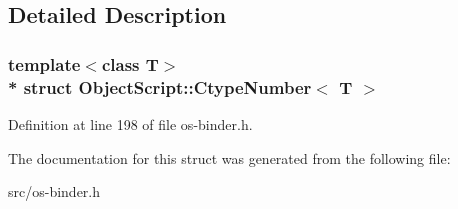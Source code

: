 \subsection{Detailed Description}
\subsubsection*{template$<$class T$>$\\*
struct Object\+Script\+::\+Ctype\+Number$<$ T $>$}



Definition at line 198 of file os-\/binder.\+h.



The documentation for this struct was generated from the following file\+:\begin{DoxyCompactItemize}
\item 
src/os-\/binder.\+h\end{DoxyCompactItemize}
